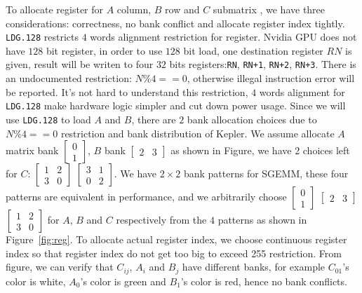 To allocate register for $A$ column, $B$ row and $C$ submatrix , we have three considerations: 
correctness, no bank
conflict and allocate register index tightly.
{\tt LDG.128} restricts $4$ words alignment restriction for register.
Nvidia GPU does not have $128$ bit register, in order to use $128$ bit load, one destination register $RN$ is given, 
result will be writen to
four $32$ bits registers:{\tt RN}, {\tt RN+1}, {\tt RN+2}, {\tt RN+3}. There is an undocumented restriction: $N\%4==0$, 
otherwise illegal instruction error will be reported.
It's not hard to understand this restriction, $4$ words alignment for {\tt LDG.128} make hardware logic simpler and cut 
down power usage.
Since we will use {\tt LDG.128} to load $A$ and $B$, there are $2$ bank allocation choices due to $N\%4==0$ restriction 
and
bank distribution of Kepler. We assume allocate $A$ matrix bank $\begin{bmatrix} 0 \\ 1  \end{bmatrix}$,
$B$ bank $\begin{bmatrix} 2 & 3 \end{bmatrix}$ as shown in Figure, we have 2 choices left for $C$:
$\begin{bmatrix} 1 & 2 \\ 3 & 0  \end{bmatrix}$
$\begin{bmatrix} 3 & 1 \\ 0 & 2  \end{bmatrix}$.
We have $2\times2$ bank patterns for SGEMM, these four patterns are equivalent in performance, and we arbitrarily 
choose $\begin{bmatrix} 0 \\ 1  \end{bmatrix}$ $\begin{bmatrix} 2 & 3 \end{bmatrix}$
    $\begin{bmatrix} 1 & 2 \\ 3 & 0  \end{bmatrix}$ for $A$, $B$ and $C$ respectively from the $4$ patterns as shown in 
Figure~\ref{fig:reg}.
To allocate actual register index, we choose continuous register index so that register index do not get too big to
exceed 255 restriction. From figure, we can verify that $C_{ij}$, $A_i$ and $B_j$ have different banks, for example
$C_{01}$'s color is white, $A_0$'s color is green and $B_1$'s color is red, hence no bank conflicts.

